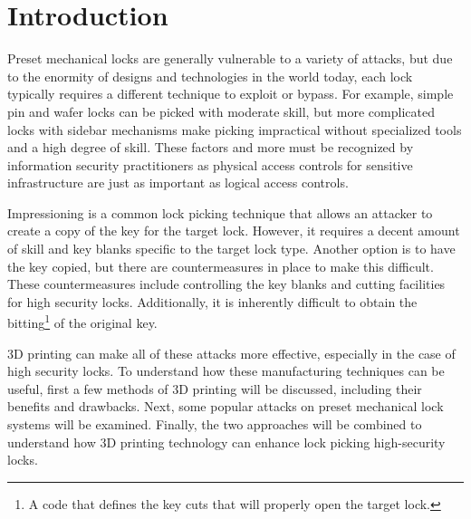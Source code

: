 \documentclass{acm_proc_article-sp}
\begin{document}
\section{Introduction}
Preset mechanical locks are generally vulnerable to a variety of attacks, but due to the enormity of designs and technologies in the world today, each lock typically requires a different technique to exploit or bypass. For example, simple pin and wafer locks can be picked with moderate skill, but more complicated locks with sidebar mechanisms make picking impractical without specialized tools and a high degree of skill. These factors and more must be recognized by information security practitioners as physical access controls for sensitive infrastructure are just as important as logical access controls.

Impressioning is a common lock picking technique that allows an attacker to create a copy of the key for the target lock. However, it requires a decent amount of skill and key blanks specific to the target lock type. Another option is to have the key copied, but there are countermeasures in place to make this difficult. These countermeasures include controlling the key blanks and cutting facilities for high security locks. Additionally, it is inherently difficult to obtain the bitting\footnote{A code that defines the key cuts that will properly open the target lock.} of the original key.

3D printing can make all of these attacks more effective, especially in the case of high security locks. To understand how these manufacturing techniques can be useful, first a few methods of 3D printing will be discussed, including their benefits and drawbacks. Next, some popular attacks on preset mechanical lock systems will be examined. Finally, the two approaches will be combined to understand how 3D printing technology can enhance lock picking high-security locks.
\end{document}
